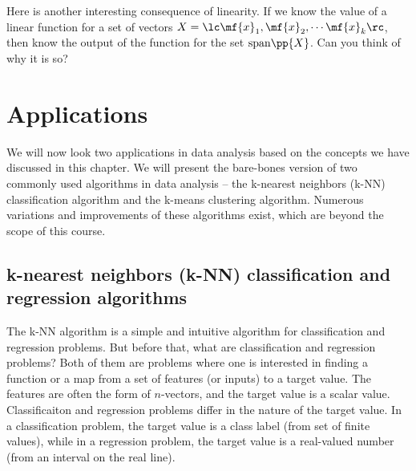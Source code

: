 Here is another interesting consequence of linearity. If we know the value of a linear function for a set of vectors $X = \lc \mf{x}_1, \mf{x}_2, \cdots \mf{x}_k \rc$, then know the output of the function for the set $\text{span}\pp{X}$. Can you think of why it is so?

\section{Applications}

We will now look two applications in data analysis based on the concepts we have discussed in this chapter. We will present the bare-bones version of two commonly used algorithms in data analysis -- the k-nearest neighbors (k-NN) classification algorithm and the k-means clustering algorithm. Numerous variations and improvements of these algorithms exist, which are beyond the scope of this course.

\subsection{k-nearest neighbors (k-NN) classification and regression algorithms}
The k-NN algorithm is a simple and intuitive algorithm for classification and regression problems. But before that, what are classification and regression problems? Both of them are problems where one is interested in finding a function or a map from a set of features (or inputs) to a target value. The features are often the form of $n$-vectors, and the target value is a scalar value. Classificaiton and regression problems differ in the nature of the target value. In a classification problem, the target value is a class label (from set of finite values), while in a regression problem, the target value is a real-valued number (from an interval on the real line).


